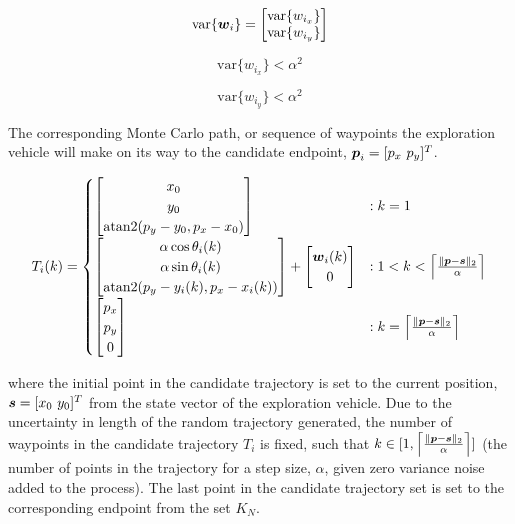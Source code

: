 \begin{equation}
\text{var}\{{\it{\boldsymbol{w}}}_i\} = \begin{bmatrix} \text{var}\{w_{i_x}\} \\ \text{var}\{w_{i_y}\} \end{bmatrix}
\end{equation}

\begin{equation}
\text{var}\{w_{i_x}\} < \alpha^2
\end{equation}

\begin{equation}
\text{var}\{w_{i_y}\} < \alpha^2
\end{equation}

The corresponding Monte Carlo path, or sequence of waypoints the exploration vehicle will make on its way to the candidate endpoint, ${\it{\boldsymbol{p}}}_i = [p_x\ p_y]^T$.

\begin{equation}
\label{eq:mcpp}
T_{i}(k) = \begin{cases}
	\begin{bmatrix}
		x_0 \\
		y_0\\
		\text{atan2}(p_y - y_0, p_x - x_0)
	\end{bmatrix} & : k = 1 \\

	\begin{bmatrix}
		\alpha \cos \theta_i(k) \\
		\alpha \sin \theta_i(k) \\
		\text{atan2}(p_y - y_i(k), p_x - x_i(k))
	\end{bmatrix} + \begin{bmatrix} 
		{\it{\boldsymbol{w}}}_i(k) \\
		0
	\end{bmatrix} & : 1 < k < \Big\lceil \frac{\|{\it{\boldsymbol{p}}} - {\it{\boldsymbol{s}}}\|_2}{\alpha} \Big\rceil \\


	\begin{bmatrix} p_x \\ p_y \\ 0\end{bmatrix} & : k = \Big\lceil \frac{\|{\it{\boldsymbol{p}}} - {\it{\boldsymbol{s}}}\|_2}{\alpha} \Big\rceil \\

\end{cases}
\end{equation}

\noindent where the initial point in the candidate trajectory is set to the current position, $\vect{s}=[x_0\ y_0]^T$ from the state vector of the exploration vehicle. Due to the uncertainty in length of the random trajectory generated, the number of waypoints in the candidate trajectory $T_i$ is fixed, such that $k \in [1, \Big\lceil \frac{\|{\it{\boldsymbol{p}}}- {\it{\boldsymbol{s}}}\|_2}{\alpha} \Big\rceil]$ (the number of points in the trajectory for a step size, $\alpha$, given zero variance noise added to the process). The last point in the candidate trajectory set is set to the corresponding endpoint from the set $K_N$.


